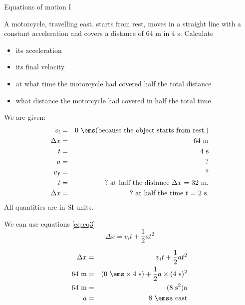 \vspace{-1cm}
      \noindent
\begin{wex}{Equations of motion I}{A motorcycle, travelling east, starts from rest, moves in a straight line with a constant acceleration and covers a distance of 64 m in 4 s. Calculate
\begin{itemize}
\item its acceleration
\item its final velocity
\item at what time the motorcycle had covered half the total distance
\item what distance the motorcycle had covered in half the total time.
\end{itemize}}
{
We are given:
\begin{eqnarray*}
v_i&=&0\ \ems \mbox{(because the object starts from rest.)}\\
\Delta x&=&64\ \text{m}\\
t&=&4\ \text{s}\\
a&=&?\\
v_f&=&?\\
t&=&?\ \mbox{at half the distance $\Delta x$~=~32~m.}\\
\Delta x&=&?\ \mbox{at half the time $t$~=~2~s.}
\end{eqnarray*}
All quantities are in SI units.

We can use equations \ref{eq:eq3}
\begin{displaymath}
\Delta x = v_it +\frac{1}{2}at^2
\end{displaymath}

\begin{eqnarray*}
\Delta x &=& v_it +\frac{1}{2}at^2\\
64\ \text{m} &=& (0\ \ems \times 4\ \text{s}) + \frac{1}{2} a \times (4\ \text{s})^2\\
64\ \text{m} &=& (8\ \text{s}^2) \text{a}\\
a &=&8\ \emss~\text{east}
\end{eqnarray*}

}
\end{wex}
